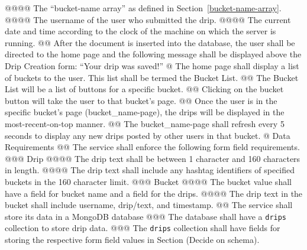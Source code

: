 \documentclass{article}
\begin{document}
\begin{easylist}[articletoc]
@@@@ The ``bucket-name array'' as defined in Section~\ref{bucket-name-array}.
@@@@ The username of the user who submitted the drip.
@@@@ The current date and time according to the clock of the machine on which the server is running.
@@ After the document is inserted into the database, the user shall be directed to the home page and the following message shall be displayed above the Drip Creation form: ``Your drip was saved!''
@ The home page shall display a list of buckets to the user. This list shall be termed the Bucket List.
@@ The Bucket List will be a list of buttons for a specific bucket.
@@ Clicking on the bucket button will take the user to that bucket’s page.
@@ Once the user is in the specific bucket’s page (bucket\_name-page), the drips will be displayed in the most-recent-on-top manner.
@@ The bucket\_name-page shall refresh every 5 seconds to display any new drips posted by other users in that bucket.
@ Data Requirements
@@ The service shall enforce the following form field requirements.
@@@ Drip
@@@@ The drip text shall be between 1 character and 160 characters in length.
@@@@ The drip text shall include any hashtag identifiers of specified buckets in the 160 character limit.
@@@ Bucket
@@@@ The bucket value shall have a field for bucket name and a field for the drips.
@@@@ The drip text in the bucket shall include username, drip/text, and timestamp.
@@ The service shall store its data in a MongoDB database
@@@ The database shall have a \texttt{drips} collection to store drip data.
@@@ The \texttt{drips} collection shall have fields for storing the respective form field values in Section (Decide on schema).

\end{easylist}
\end{document}
